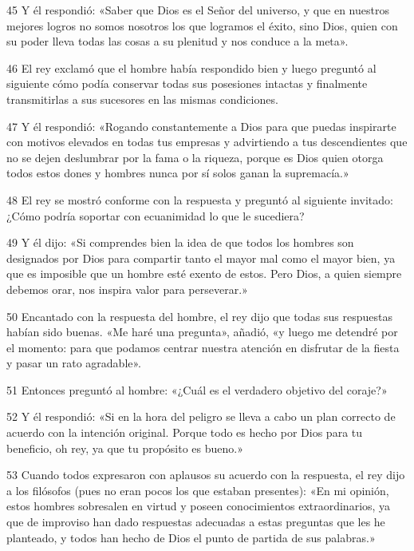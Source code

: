 \par 45 Y él respondió: «Saber que Dios es el Señor del universo, y que en nuestros mejores logros no somos nosotros los que logramos el éxito, sino Dios, quien con su poder lleva todas las cosas a su plenitud y nos conduce a la meta».

\par 46 El rey exclamó que el hombre había respondido bien y luego preguntó al siguiente cómo podía conservar todas sus posesiones intactas y finalmente transmitirlas a sus sucesores en las mismas condiciones.

\par 47 Y él respondió: «Rogando constantemente a Dios para que puedas inspirarte con motivos elevados en todas tus empresas y advirtiendo a tus descendientes que no se dejen deslumbrar por la fama o la riqueza, porque es Dios quien otorga todos estos dones y hombres nunca por sí solos ganan la supremacía.»

\par 48 El rey se mostró conforme con la respuesta y preguntó al siguiente invitado: ¿Cómo podría soportar con ecuanimidad lo que le sucediera?

\par 49 Y él dijo: «Si comprendes bien la idea de que todos los hombres son designados por Dios para compartir tanto el mayor mal como el mayor bien, ya que es imposible que un hombre esté exento de estos. Pero Dios, a quien siempre debemos orar, nos inspira valor para perseverar.»

\par 50 Encantado con la respuesta del hombre, el rey dijo que todas sus respuestas habían sido buenas. «Me haré una pregunta», añadió, «y luego me detendré por el momento: para que podamos centrar nuestra atención en disfrutar de la fiesta y pasar un rato agradable».

\par 51 Entonces preguntó al hombre: «¿Cuál es el verdadero objetivo del coraje?»

\par 52 Y él respondió: «Si en la hora del peligro se lleva a cabo un plan correcto de acuerdo con la intención original. Porque todo es hecho por Dios para tu beneficio, oh rey, ya que tu propósito es bueno.»

\par 53 Cuando todos expresaron con aplausos su acuerdo con la respuesta, el rey dijo a los filósofos (pues no eran pocos los que estaban presentes): «En mi opinión, estos hombres sobresalen en virtud y poseen conocimientos extraordinarios, ya que de improviso han dado respuestas adecuadas a estas preguntas que les he planteado, y todos han hecho de Dios el punto de partida de sus palabras.»

